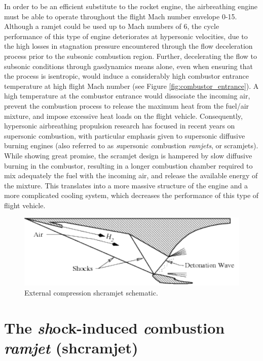 In order to be an efficient substitute to the rocket engine, the airbreathing engine
must be able to operate throughout the flight Mach number envelope 0-15. Although a
ramjet could be used up to Mach numbers of 6, the cycle performance of this type of
engine deteriorates at hypersonic velocities, due to the high losses in stagnation
pressure encountered through the flow deceleration process prior to the subsonic
combustion region. Further, decelerating the flow to subsonic conditions
through gasdynamics means alone, even when ensuring that the process is isentropic,
would induce a considerably high combustor entrance temperature
at high flight Mach number (see Figure \ref{fig:combustor_entrance}).
A high temperature at the combustor entrance would dissociate the incoming air, prevent
the combustion process to release the maximum heat from the fuel/air mixture,
and impose excessive heat
loads on the flight vehicle. Consequently, hypersonic airbreathing propulsion research has
focused in recent years on supersonic combustion, with particular emphasis
given to supersonic diffusive burning engines \cite{aiaaconf:2001:mcclinton}
(also referred to as
\emph{s}upersonic \emph{c}ombustion \emph{ramjets}, or scramjets). While showing great
promise, the scramjet design is hampered by slow diffusive burning in the combustor,
resulting in a longer combustion chamber required to mix adequately the fuel with the
incoming air, and release the available energy of the mixture. This translates into a
more massive structure of the engine and a more complicated cooling system, which
decreases the performance of this type of flight vehicle.
%
\begin{figure}[!h]
   \center
   \includegraphics[width=4.0\lengthfigure]{fig1/shcramjet.pdf}
   \caption{External compression shcramjet schematic.}
   \label{fig:shcramjet}
\end{figure}
%



\section{The \emph{sh}ock-induced \emph{c}ombustion \emph{ramjet} (shcramjet)}


